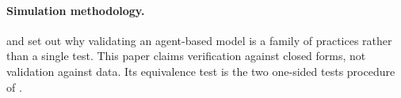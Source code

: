 \paragraph{Simulation methodology.} \citet{windrum2007} and \citet{fagiolo2007}
set out why validating an agent-based model is a family of practices rather than
a single test. This paper claims verification against closed forms, not
validation against data. Its equivalence test is the two one-sided tests
procedure of \citet{lakens2017}.
